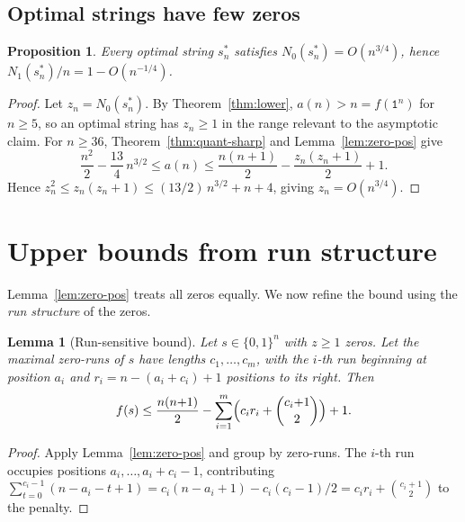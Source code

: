 \documentclass[11pt,a4paper]{article}
\theoremstyle{plain}
\newtheorem{lemma}[theorem]{Lemma}
\newtheorem{proposition}[theorem]{Proposition}
\theoremstyle{definition}
\theoremstyle{remark}
\newcommand{\ones}{N_1}
\newcommand{\zeros}{N_0}
\begin{document}
\subsection{Optimal strings have few zeros}

\begin{proposition}\label{prop:optimal-density}
  Every optimal string $s_n^*$ satisfies
  $\zeros(s_n^*) = O(n^{3/4})$, hence
  $\ones(s_n^*)/n = 1 - O(n^{-1/4})$.
\end{proposition}

\begin{proof}
  Let $z_n = \zeros(s_n^*)$.  By Theorem~\ref{thm:lower},
  $a(n) > n = f(\mathtt{1}^n)$ for $n \ge 5$, so an optimal string
  has $z_n \ge 1$ in the range relevant to the asymptotic claim.  For
  $n \ge 36$, Theorem~\ref{thm:quant-sharp} and Lemma~\ref{lem:zero-pos}
  give
  \[
    \frac{n^2}{2} - \frac{13}{4}\,n^{3/2}
    \le a(n)
    \le \frac{n(n{+}1)}{2} - \frac{z_n(z_n{+}1)}{2} + 1.
  \]
  Hence $z_n^2 \le z_n(z_n{+}1) \le (13/2)\,n^{3/2} + n + 4$,
  giving $z_n = O(n^{3/4})$.
\end{proof}

\section{Upper bounds from run structure}\label{sec:runs}

Lemma~\ref{lem:zero-pos} treats all zeros equally.  We now refine
the bound using the \emph{run structure} of the zeros.

\begin{lemma}[Run-sensitive bound]\label{lem:run-sensitive}
  Let $s \in \{0,1\}^n$ with $z \ge 1$ zeros.  Let the maximal
  zero-runs of $s$ have lengths $c_1,\ldots,c_m$,
  with the $i$-th run beginning at position $a_i$ and
  $r_i = n - (a_i + c_i) + 1$ positions to its right.  Then
  \[
    f(s) \le \frac{n(n{+}1)}{2}
      - \sum_{i=1}^m \Bigl(c_i r_i + \binom{c_i{+}1}{2}\Bigr) + 1.
  \]
\end{lemma}

\begin{proof}
  Apply Lemma~\ref{lem:zero-pos} and group by zero-runs.
  The $i$-th run occupies positions $a_i,\ldots,a_i + c_i - 1$,
  contributing
  $\sum_{t=0}^{c_i-1}(n - a_i - t + 1)
  = c_i(n - a_i + 1) - c_i(c_i{-}1)/2
  = c_i r_i + \binom{c_i{+}1}{2}$
  to the penalty.
\end{proof}
\end{document}
